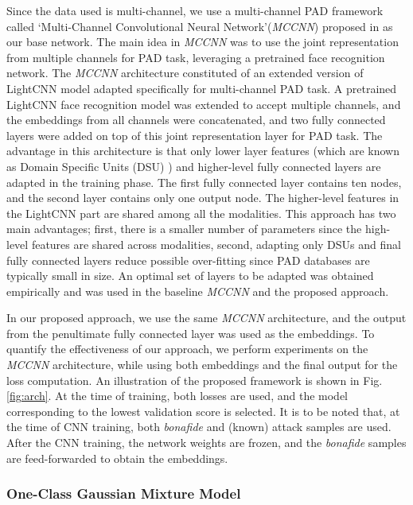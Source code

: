 \documentclass[journal]{IEEEtran}
\begin{document}
Since the data used is multi-channel, we use a multi-channel PAD framework called  `Multi-Channel Convolutional Neural Network'(\textit{MCCNN}) proposed in \cite{george_mccnn_tifs2019} as our base network. The main idea in \textit{MCCNN} was to use the joint representation from multiple channels for PAD task, leveraging a pretrained face recognition network. The \textit{MCCNN} architecture constituted of an extended version of LightCNN model \cite{wu2018light} adapted specifically for multi-channel PAD task. A pretrained LightCNN face recognition model was extended to accept multiple channels, and the embeddings from all channels were concatenated, and two fully connected layers were added on top of this joint representation layer for PAD task. The advantage in this architecture is that only lower layer features (which are known as Domain Specific Units (DSU) \cite{freitas2018heterogeneous} ) and higher-level fully connected layers are adapted in the training phase. The first fully connected layer contains ten nodes, and the second layer contains only one output node. The higher-level features in the LightCNN part are shared among all the modalities. This approach has two main advantages; first, there is a smaller number of parameters since the high-level features are shared across modalities, second, adapting only DSUs and final fully connected layers reduce possible over-fitting since PAD databases are typically small in size. An optimal set of layers to be adapted was obtained empirically and was used in the baseline \textit{MCCNN} and the proposed approach.

In our proposed approach, we use the same \textit{MCCNN} architecture, and the output from the penultimate fully connected layer was used as the embeddings. To quantify the effectiveness of our approach, we perform experiments on the \textit{MCCNN} architecture, while using both embeddings and the final output for the loss computation. An illustration of the proposed framework is shown in Fig. \ref{fig:arch}. At the time of training, both losses are used, and the model corresponding to the lowest validation score is selected. It is to be noted that, at the time of CNN training, both \textit{bonafide} and (known) attack samples are used.  After the CNN training, the network weights are frozen, and the \textit{bonafide} samples are feed-forwarded to obtain the embeddings.
\subsubsection{One-Class Gaussian Mixture Model}
\end{document}
